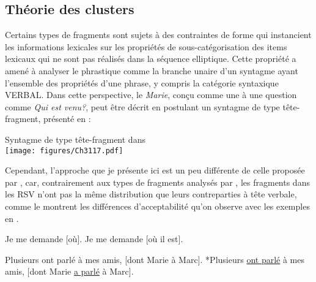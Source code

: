 \subsection{Théorie des clusters}\label{ch3:sect3.5.2}

Certains types de fragments sont sujets à des contraintes de forme qui instancient les informations lexicales sur les propriétés de sous-catégorisation des items lexicaux qui ne sont pas réalisés dans la séquence elliptique. Cette propriété a amené \citet{GinzburgEtAl2000} à analyser le  phrastique comme la branche unaire d’un syntagme ayant l’ensemble des propriétés d’une phrase, y compris la catégorie syntaxique VERBAL. Dans cette perspective, le  \textit{Marie}, conçu comme une  à une question comme \textit{Qui est venu?}, peut être décrit en postulant un syntagme de type tête-fragment, présenté en  : 

\ea \label{ch3:ex117}
Syntagme de type tête-fragment dans \citet{GinzburgEtAl2000}\\
\texttt{[image: figures/Ch3117.pdf]}



\z

Cependant, l’approche que je présente ici est un peu différente de celle proposée par \citet{GinzburgEtAl2000}, car, contrairement aux types de fragments  analysés par \citet{GinzburgEtAl2000}, les fragments dans les RSV  n’ont pas la même distribution que leurs contreparties à tête verbale, comme le montrent les différences d’acceptabilité qu’on observe avec les exemples en .

\ea \label{ch3:ex118}
\ea 
Je me demande [où]. \label{ch3:ex118a} 
\ex
Je me demande [où il est]. \label{ch3:ex118b}
\z 
\z 

\ea \label{ch3:ex119}
\ea 
Plusieurs ont parlé à mes amis, [dont Marie à Marc]. \label{ch3:ex119a} 
\ex
*Plusieurs \uline{ont parlé} à mes amis, [dont Marie \uline{a parlé} à Marc]. \label{ch3:ex119b}
\z 
\z


